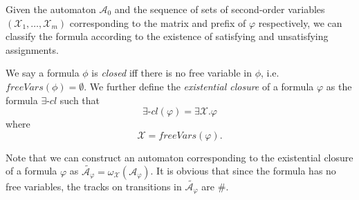 % 

Given the automaton $\mathcal{A}_0$ and the sequence of sets of second-order
variables $(\mathcal{X}_1,\ldots,\mathcal{X}_m)$ corresponding to the matrix
and prefix of $\varphi$ respectively, we can classify the formula according to
the existence of satisfying and unsatisfying assignments.

\begin{defz}
We say a formula $\phi$ is \emph{closed} iff there is no free variable in
$\phi$, i.e.
$\mathit{freeVars}(\phi) = \emptyset$.
We further define the \emph{existential closure} of a formula $\varphi$ as
the formula $\exists\mbox{-}\mathit{cl}$ such that
\begin{equation}
 \exists\mbox{-}\mathit{cl}(\varphi) = \exists\mathcal{X}. \varphi
\end{equation}
where
\begin{equation}
 \mathcal{X} = \mathit{freeVars}(\varphi).
\end{equation}

Note that we can construct an automaton corresponding to the existential closure
of a formula $\varphi$ as $\widetilde{\mathcal{A_\varphi}} =
\omega_\mathcal{X}(\mathcal{A}_\varphi)$.
It is obvious that since the formula has no free variables, the tracks on transitions
in $\widetilde{\mathcal{A}_\varphi}$ are $\#$.
\end{defz}

